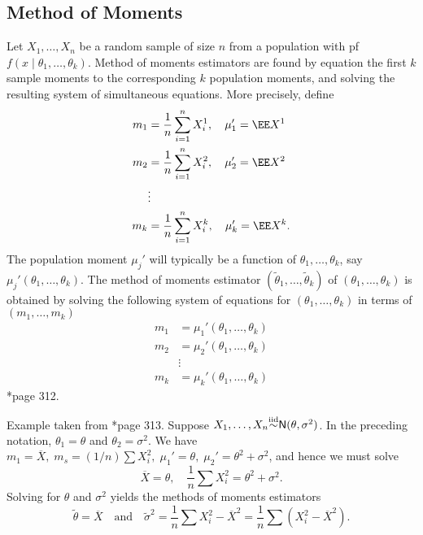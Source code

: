 \subsection*{Method of Moments}

\begin{defe} \label{defe: mom}
    Let $X_1, \ldots , X_n$ be a random sample of size $n$ from a population with pf $f(x \mid \theta_1 , \ldots , \theta_k)$. Method of moments estimators are found by equation the first $k$ sample moments to the corresponding $k$ population moments, and solving the resulting system of simultaneous equations. More precisely, define
    \begin{align*}
        m_1 & = \frac{1}{n} \sum_{i=1}^{n} X_{i}^{1}, \quad \mu_{1}' = \EE X^1   \\
        m_2 & = \frac{1}{n} \sum_{i=1}^{n} X_{i}^{2}, \quad \mu_{2}' = \EE X^2   \\
            & \vdots                                                             \\
        m_k & = \frac{1}{n} \sum_{i=1}^{n} X_{i}^{k}, \quad \mu_{k}' = \EE X^k .
    \end{align*}
    The population moment $\mu_{j}'$ will typically be a function of $\theta_1 , \ldots , \theta_k$, say $\mu_{j}' (\theta_1 , \ldots , \theta_k)$. The method of moments estimator $(\tilde{\theta}_1 , \ldots , \tilde{\theta}_k)$ of $(\theta_1 , \ldots , \theta_k)$ is obtained by solving the following system of equations for $(\theta_1 , \ldots , \theta_k)$ in terms of $(m_1 , \ldots , m_k)$
    \begin{align*}
        m_1 & = \mu_{1}' (\theta_1 , \ldots , \theta_k) \\
        m_2 & = \mu_{2}' (\theta_1 , \ldots , \theta_k) \\
            & \vdots                                    \\
        m_k & = \mu_{k}' (\theta_1 , \ldots , \theta_k)
    \end{align*}
    \cite{CasellaGeorge2001SI}*{page 312}.
\end{defe}

\begin{exam} \label{exam: normal_mom}
    Example taken from \cite{CasellaGeorge2001SI}*{page 313}. Suppose $X_1, \ldots , X_n {\overset{\text{iid}}{\sim}} {\sf N} (\theta , \sigma^2)$. In the preceding notation, $\theta_1 = \theta$ and $\theta_2 = \sigma^2$. We have $m_1 = \overline{X}, \; m_s = (1/n) \sum X_{i}^{2}, \; \mu_{1}' = \theta, \; \mu_{2}' = \theta^2 + \sigma^2$, and hence we must solve
    \begin{equation*}
        \overline{X} = \theta, \quad \frac{1}{n} \sum X_{i}^{2} = \theta^2 + \sigma^2.
    \end{equation*}
    Solving for $\theta$ and $\sigma^2$ yields the methods of moments estimators
    \begin{equation*}
        \tilde{\theta} = \overline{X} \quad \text{and} \quad \tilde{\sigma}^2 = \frac{1}{n} \sum X_{i}^{2} - \overline{X}^2 = \frac{1}{n} \sum (X_{i}^{2} - \overline{X}^2).
    \end{equation*}
\end{exam}